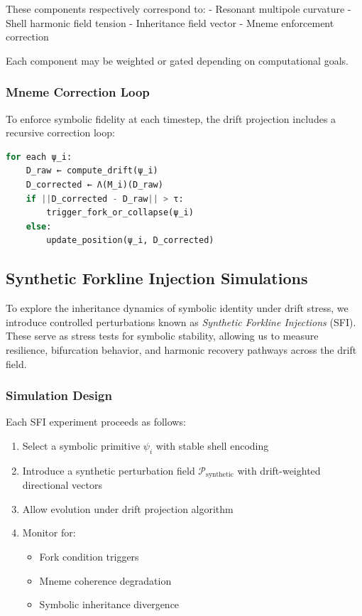 \documentclass[12pt]{article}
\begin{document}
These components respectively correspond to:
- Resonant multipole curvature  
- Shell harmonic field tension  
- Inheritance field vector  
- Mneme enforcement correction  

Each component may be weighted or gated depending on computational goals.

\subsubsection{Mneme Correction Loop}

To enforce symbolic fidelity at each timestep, the drift projection includes a recursive correction loop:

\begin{lstlisting}[language=Python]
for each ψ_i:
    D_raw ← compute_drift(ψ_i)
    D_corrected ← Λ(M_i)(D_raw)
    if ||D_corrected - D_raw|| > τ:
        trigger_fork_or_collapse(ψ_i)
    else:
        update_position(ψ_i, D_corrected)
\end{lstlisting}

\subsection{Synthetic Forkline Injection Simulations}

To explore the inheritance dynamics of symbolic identity under drift stress, we introduce controlled perturbations known as \textit{Synthetic Forkline Injections} (SFI). These serve as stress tests for symbolic stability, allowing us to measure resilience, bifurcation behavior, and harmonic recovery pathways across the drift field.

\subsubsection{Simulation Design}

Each SFI experiment proceeds as follows:

\begin{enumerate}
  \item Select a symbolic primitive \( \psi_i \) with stable shell encoding
  \item Introduce a synthetic perturbation field \( \mathcal{P}_{\text{synthetic}} \) with drift-weighted directional vectors
  \item Allow evolution under drift projection algorithm
  \item Monitor for:
    \begin{itemize}
      \item Fork condition triggers
      \item Mneme coherence degradation
      \item Symbolic inheritance divergence
    \end{itemize}
\end{enumerate}
\end{document}
